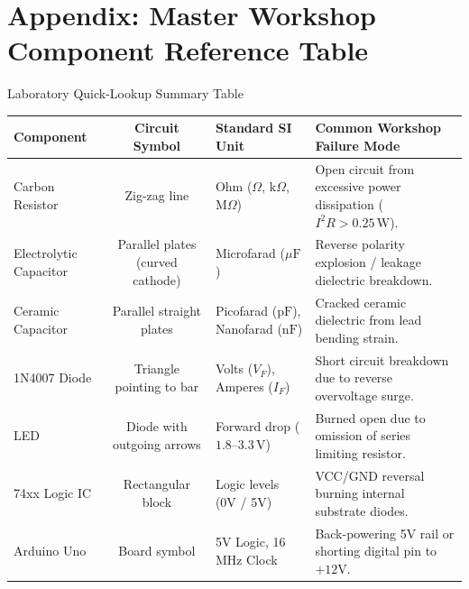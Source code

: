 \chapter{Appendix: Master Workshop Component Reference Table}

\begin{formulabox}{Laboratory Quick-Lookup Summary Table}
\begin{center}
\begin{tabular}{p{2.5cm}cp{3.5cm}p{5.5cm}}
\toprule
\textbf{Component} & \textbf{Circuit Symbol} & \textbf{Standard SI Unit} & \textbf{Common Workshop Failure Mode} \\
\midrule
Carbon Resistor & Zig-zag line & Ohm ($\Omega$, $\mathrm{k}\Omega$, $\mathrm{M}\Omega$) & Open circuit from excessive power dissipation ($I^2 R > 0.25\,\mathrm{W}$). \\
Electrolytic Capacitor & Parallel plates (curved cathode) & Microfarad ($\mu\mathrm{F}$) & Reverse polarity explosion / leakage dielectric breakdown. \\
Ceramic Capacitor & Parallel straight plates & Picofarad ($\mathrm{pF}$), Nanofarad ($\mathrm{nF}$) & Cracked ceramic dielectric from lead bending strain. \\
1N4007 Diode & Triangle pointing to bar & Volts ($V_F$), Amperes ($I_F$) & Short circuit breakdown due to reverse overvoltage surge. \\
LED & Diode with outgoing arrows & Forward drop ($1.8\text{--}3.3\,\mathrm{V}$) & Burned open due to omission of series limiting resistor. \\
74xx Logic IC & Rectangular block & Logic levels (0V / 5V) & VCC/GND reversal burning internal substrate diodes. \\
Arduino Uno & Board symbol & 5V Logic, 16 MHz Clock & Back-powering 5V rail or shorting digital pin to $+12\text{V}$. \\
\bottomrule
\end{tabular}
\end{center}
\end{formulabox}
